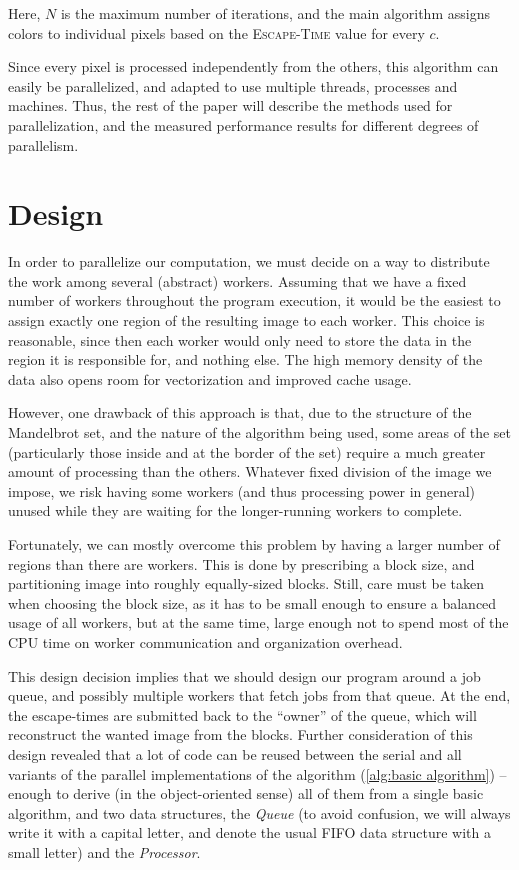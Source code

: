 \documentclass[a4paper]{article}
\begin{document}
	Here, $N$ is the maximum number of iterations, and the main algorithm assigns colors to individual pixels based on the \textsc{Escape-Time} value for every $c$.
	
	Since every pixel is processed independently from the others, this algorithm can easily be parallelized, and adapted to use multiple threads, processes and machines. Thus, the rest of the paper will describe the methods used for parallelization, and the measured performance results for different degrees of parallelism. 
	
	\section{Design}
	In order to parallelize our computation, we must decide on a way to distribute the work among several (abstract) workers. Assuming that we have a fixed number of workers throughout the program execution, it would be the easiest to assign exactly one region of the resulting image to each worker. This choice is reasonable, since then each worker would only need to store the data in the region it is responsible for, and nothing else. The high memory density of the data also opens room for vectorization and improved cache usage. 
	
	However, one drawback of this approach is that, due to the structure of the Mandelbrot set, and the nature of the algorithm being used, some areas of the set (particularly those inside and at the border of the set) require a much greater amount of processing than the others. Whatever fixed division of the image we impose, we risk having some workers (and thus processing power in general) unused while they are waiting for the longer-running workers to complete.
	
	Fortunately, we can mostly overcome this problem by having a larger number of regions than there are workers. This is done by prescribing a block size, and partitioning image into roughly equally-sized blocks. Still, care must be taken when choosing the block size, as it has to be small enough to ensure a balanced usage of all workers, but at the same time, large enough not to spend most of the CPU time on worker communication and organization overhead.
	
	This design decision implies that we should design our program around a job queue, and possibly multiple workers that fetch jobs from that queue. At the end, the escape-times are submitted back to the ``owner'' of the queue, which will reconstruct the wanted image from the blocks. Further consideration of this design revealed that a lot of code can be reused between the serial and all variants of the parallel implementations of the algorithm (\ref{alg:basic algorithm}) -- enough to derive (in the object-oriented sense) all of them from a single basic algorithm, and two data structures, the \emph{Queue} (to avoid confusion, we will always write it with a capital letter, and denote the usual FIFO data structure with a small letter) and the \emph{Processor}. 
	
\end{document}
